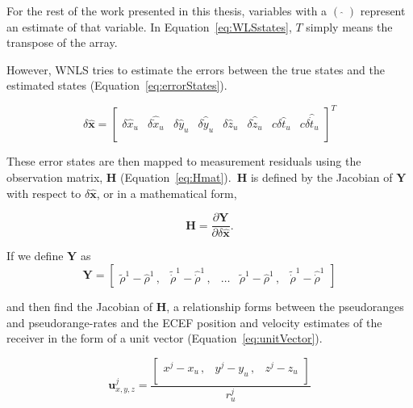 For the rest of the work presented in this thesis, variables with a \({\left(\;\hat{}\;\right)} \) represent an estimate of that variable. In Equation~\ref{eq:WLSstates}, \(T\) simply means the transpose of the array.

However, WNLS tries to estimate the errors between the true states and the estimated states (Equation~\ref{eq:errorStates}).

\begin{equation}\label{eq:errorStates}
    \delta\hat{\mathbf{x}} =
    \begin{bmatrix}
        \delta\hat{x}_u & \delta\hat{\dot{x}}_u & \delta\hat{y}_u & \delta\hat{\dot{y}}_u & \delta\hat{z}_u & \delta\hat{\dot{z}}_u & c\delta\hat{t}_u & c\delta\hat{\dot{t}}_u \\
    \end{bmatrix}^T
\end{equation}

These error states are then mapped to measurement residuals using the observation matrix, \(\mathbf{H}\) (Equation~\ref{eq:Hmat}).~\(\mathbf{H}\) is defined by the Jacobian of \(\mathbf{Y}\) with respect to \(\delta\hat{\mathbf{x}}\), or in a mathematical form,

\begin{equation}\label{eq:Jacobian}
    \mathbf{H} = \frac{\partial \mathbf{Y}}{\partial \delta\hat{\mathbf{x}}}.
\end{equation}

If we define \(\mathbf{Y}\) as
\begin{equation}\label{eq:Z}
    \mathbf{Y} =
    \begin{bmatrix}
        {\tilde{\rho}^1 - \hat{\rho}^1}\,, & {\tilde{\dot{\rho}}^1 - \hat{\dot{\rho}}^1}\,, & \hdots & {\tilde{\rho}^1 - \hat{\rho}^1}\, , & {\tilde{\dot{\rho}}^1 - \hat{\dot{\rho}}^1}
    \end{bmatrix}
\end{equation}

and then find the Jacobian of \(\mathbf{H}\), a relationship forms between the pseudoranges and pseudorange-rates and the ECEF position and velocity estimates of the receiver in the form of a unit vector (Equation~\ref{eq:unitVector}).

\begin{equation}\label{eq:unitVector}
    \mathbf{u}^j_{x,y,z} = \frac{\begin{bmatrix}
            x^j - x_u\, , & y^j - y_u\, , & z^j - z_u \\
        \end{bmatrix}
    }{r^j_u}
\end{equation}

